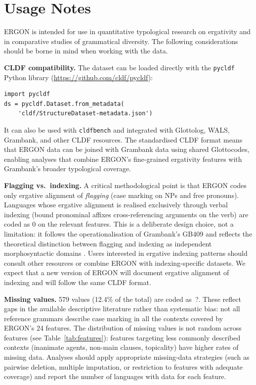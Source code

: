\documentclass[12pt,a4paper]{article}
\begin{document}
\section{Usage Notes}

ERGON is intended for use in quantitative typological research on ergativity and in comparative studies of grammatical diversity. The following considerations should be borne in mind when working with the data.

\textbf{CLDF compatibility.} The dataset can be loaded directly with the \texttt{pycldf} Python library (\url{https://github.com/cldf/pycldf}):

\begin{verbatim}
import pycldf
ds = pycldf.Dataset.from_metadata(
    'cldf/StructureDataset-metadata.json')
\end{verbatim}

\noindent It can also be used with \texttt{cldfbench} \cite{forkel2018} and integrated with Glottolog, WALS, Grambank, and other CLDF resources. The standardised CLDF format means that ERGON data can be joined with Grambank data using shared Glottocodes, enabling analyses that combine ERGON's fine-grained ergativity features with Grambank's broader typological coverage.

\textbf{Flagging vs.\ indexing.} A critical methodological point is that ERGON codes only ergative alignment of \textit{flagging} (case marking on NPs and free pronouns). Languages whose ergative alignment is realised exclusively through verbal indexing (bound pronominal affixes cross-referencing arguments on the verb) are coded as 0 on the relevant features. This is a deliberate design choice, not a limitation: it follows the operationalisation of Grambank's GB409 and reflects the theoretical distinction between flagging and indexing as independent morphosyntactic domains \cite{haspelmath2013,nichols1986}. Users interested in ergative indexing patterns should consult other resources or combine ERGON with indexing-specific datasets. We expect that a new version of ERGON will document ergative alignment of indexing and will follow the same CLDF format.

\textbf{Missing values.} 579 values (12.4\% of the total) are coded as~?. These reflect gaps in the available descriptive literature rather than systematic bias: not all reference grammars describe case marking in all the contexts covered by ERGON's 24 features. The distribution of missing values is not random across features (see Table~\ref{tab:features}): features targeting less commonly described contexts (inanimate agents, non-main clauses, topicality) have higher rates of missing data. Analyses should apply appropriate missing-data strategies (such as pairwise deletion, multiple imputation, or restriction to features with adequate coverage) and report the number of languages with data for each feature.
\end{document}
